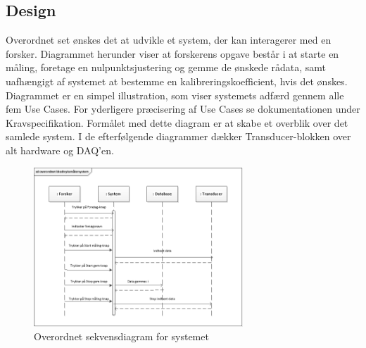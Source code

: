 \subsection{Design}
Overordnet set ønskes det at udvikle et system, der kan interagerer med en forsker. Diagrammet herunder viser at forskerens opgave består i at starte en måling, foretage en nulpunktsjustering og gemme de ønskede rådata, samt uafhængigt af systemet at bestemme en kalibreringskoefficient, hvis det ønskes. Diagrammet er en simpel illustration, som viser systemets adfærd gennem alle fem Use Cases. For yderligere præcisering af Use Cases se dokumentationen under Kravspecifikation. Formålet med dette diagram er at skabe et overblik over det samlede system. I de efterfølgende diagrammer dækker Transducer-blokken over alt hardware og DAQ'en. 
\begin{figure}[H]
	\centering
	\includegraphics[width=0.7\textwidth]{Figurer/OverordnetSD}
	\caption{Overordnet sekvensdiagram for systemet}
	\label{fig:Overordnet sekvensdiagram}
\end{figure}

